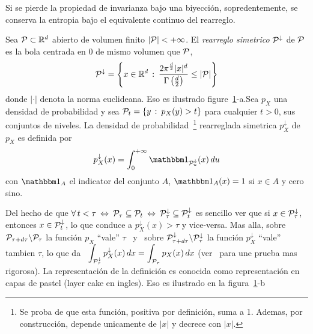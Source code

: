 Si se pierde  la propiedad de invarianza bajo  una biyecci\'on, sopredentemente,
se conserva la entropia bajo el equivalente continuo del rearreglo.
%
\begin{definicion}
  Sea $\P \subset \Rset^d$ abierto de  volumen finito $|\P| < +\infty$.  El {\it
    rearreglo simetrico}  $\P^\downarrow$ de  $\P$ es la  bola centrada en  0 de
  mismo volumen  que $\P$, \ie
  \[
  \P^\downarrow  = \left\{  x  \in  \Rset^d \,  :  \: \frac{2  \pi^{\frac{d}{2}}
      |x|^d}{\Gamma\left(\frac{d}{2}\right)} \le |\P| \right\}
  \]
  donde   $|\cdot|$   denota   la    norma   euclideana.    Eso   es   ilustrado
  figure~\ref{fig:SZ:ensemblerearreglado}-a.\newline  Sea $p_X$ una  densidad de
  probabilidad y sea $\P_t = \{ y \, : \: p_X(y) > t \}$ para cualquier $t > 0$,
  sus conjuntos  de niveles.  La densidad de  probabilidad~\footnote{Se proba de
    que  esta funci\'on,  positiva  por  definici\'on, suma  a  1.  Ademas,  por
    construcci\'on,  depende   unicamente  de   $|x|$  y  decrece   con  $|x|$.}
  rearreglada simetrica $p^\downarrow_X$ de $p_X$ es definida por
  \[
  p^\downarrow_X(x)  =  \int_0^{+\infty}  \un_{\P_u^\downarrow}(x) \,  du
  \]
  con $\un_A$ el indicator  del conjunto $A$, \ie $\un_A(x) = 1$  si $x \in A$ y
  cero sino.
\end{definicion}
%
Del hecho  de que $\forall \, t  < \tau \: \Leftrightarrow  \: \P_\tau \subseteq
\P_t  \:  \Leftrightarrow \:  \P_\tau^\downarrow  \subseteq \P_t^\downarrow$  es
sencillo   ver   que   si   $x   \in  \P_\tau^\downarrow$,   entonces   $x   \in
\P_t^\downarrow$, lo que conduce a  $p_X^\downarrow(x) > \tau$ y vice-versa. Mas
alla,  sobre $\P_{\tau+d\tau}  \backslash \P_\tau$  la funci\'on  $p_X$ ``vale''
$\tau$ \ y \ sobre $\P_{\tau+d\tau}^\downarrow \backslash \P_\tau^\downarrow$ la
funci\'on $p_X^\downarrow$  ``vale'' tambien $\tau$, lo que  da \ $\displaystyle
\int_{\P_\tau^\downarrow} p_X^\downarrow(x) \, dx = \int_{\P_\tau} p_X(x) \, dx$
(ver~\cite{LieLos01, WanMad04} para une prueba mas rigorosa).  La representaci\'on de la
definici\'on es conocida como representaci\'on en capas de pastel (layer cake en
ingles). Eso es ilustrado en la figura~\ref{fig:SZ:ensemblerearreglado}-b
  \begin{figure}[h!]
  \begin{center}  \end{center}
  \label{fig:SZ:ensemblerearreglado}
  \end{figure}

